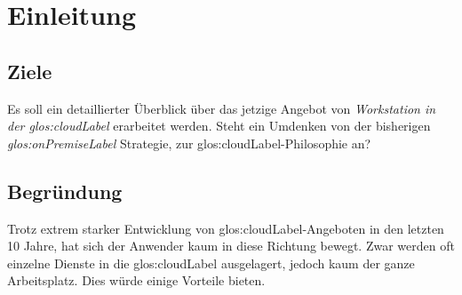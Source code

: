 \chapter{Einleitung}

\section{Ziele}
Es soll ein detaillierter Überblick über das jetzige Angebot von \textit{Workstation in der \Gls{glos:cloudLabel}} erarbeitet werden.
Steht ein Umdenken von der bisherigen \textit{\gls{glos:onPremiseLabel}} Strategie, zur \Gls{glos:cloudLabel}-Philosophie an?

\section{Begründung}
Trotz extrem starker Entwicklung von \Gls{glos:cloudLabel}-Angeboten in den letzten 10 Jahre, hat sich der Anwender kaum in diese Richtung bewegt.
Zwar werden oft einzelne Dienste in die \Gls{glos:cloudLabel} ausgelagert, jedoch kaum der ganze Arbeitsplatz. Dies würde einige Vorteile bieten.

